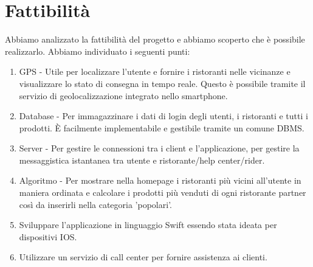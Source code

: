 \documentclass{article}
\begin{document}
\section{Fattibilità} \par\vspace{0.5cm}
\par Abbiamo analizzato la fattibilità del progetto e abbiamo scoperto che è possibile realizzarlo. Abbiamo individuato i seguenti punti: \par
\begin{enumerate}
    \item GPS - Utile per localizzare l’utente e fornire i ristoranti nelle vicinanze e visualizzare lo stato di consegna in tempo reale. Questo è possibile tramite il servizio di geolocalizzazione integrato nello smartphone.
    \item Database - Per immagazzinare i dati di login degli utenti, i ristoranti e tutti i prodotti. È facilmente implementabile e gestibile tramite un comune DBMS.
    \item Server - Per gestire le connessioni tra i client e l’applicazione, per gestire la messaggistica istantanea tra utente e ristorante/help center/rider.
    \item Algoritmo - Per mostrare nella homepage i ristoranti più vicini all’utente in maniera ordinata e calcolare i prodotti più venduti di ogni ristorante partner così da inserirli nella categoria 'popolari'.
    \item Sviluppare l’applicazione in linguaggio Swift essendo stata ideata per dispositivi IOS.
    \item Utilizzare un servizio di call center per fornire assistenza ai clienti.
\end{enumerate}
\end{document}
